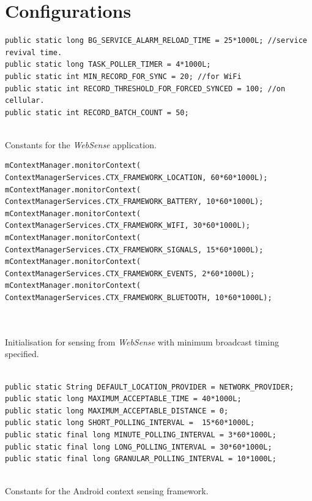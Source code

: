 \documentclass[12pt]{report}
\begin{document}
\chapter{Configurations}
\label{Config}
\begin{program}
  \begin{verbatim}
public static long BG_SERVICE_ALARM_RELOAD_TIME = 25*1000L; //service revival time.
public static long TASK_POLLER_TIMER = 4*1000L;
public static int MIN_RECORD_FOR_SYNC = 20; //for WiFi
public static int RECORD_THRESHOLD_FOR_FORCED_SYNCED = 100; //on cellular.
public static int RECORD_BATCH_COUNT = 50;
	
\end{verbatim}
\caption{Constants for the \textit{WebSense} application.}
\label{AppConstants}
\end{program}

\begin{program}
  \begin{verbatim}
mContextManager.monitorContext(
ContextManagerServices.CTX_FRAMEWORK_LOCATION, 60*60*1000L);			mContextManager.monitorContext(
ContextManagerServices.CTX_FRAMEWORK_BATTERY, 10*60*1000L);
mContextManager.monitorContext(
ContextManagerServices.CTX_FRAMEWORK_WIFI, 30*60*1000L);
mContextManager.monitorContext(
ContextManagerServices.CTX_FRAMEWORK_SIGNALS, 15*60*1000L);
mContextManager.monitorContext(
ContextManagerServices.CTX_FRAMEWORK_EVENTS, 2*60*1000L);
mContextManager.monitorContext(
ContextManagerServices.CTX_FRAMEWORK_BLUETOOTH, 10*60*1000L);
			
	
\end{verbatim}
\caption{Initialisation for sensing from \textit{WebSense} with minimum broadcast timing specified.}
\label{ContextInitCalls}
\end{program}

\begin{program}
  \begin{verbatim}

public static String DEFAULT_LOCATION_PROVIDER = NETWORK_PROVIDER;
public static long MAXIMUM_ACCEPTABLE_TIME = 40*1000L;
public static long MAXIMUM_ACCEPTABLE_DISTANCE = 0;
public static long SHORT_POLLING_INTERVAL =  15*60*1000L; 
public static final long MINUTE_POLLING_INTERVAL = 3*60*1000L;
public static final long LONG_POLLING_INTERVAL = 30*60*1000L;
public static final long GRANULAR_POLLING_INTERVAL = 10*1000L;
		
\end{verbatim}
\caption{Constants for the Android context sensing framework.}
\label{ContextFrameworkConstants}
\end{program}



	
\end{document}
